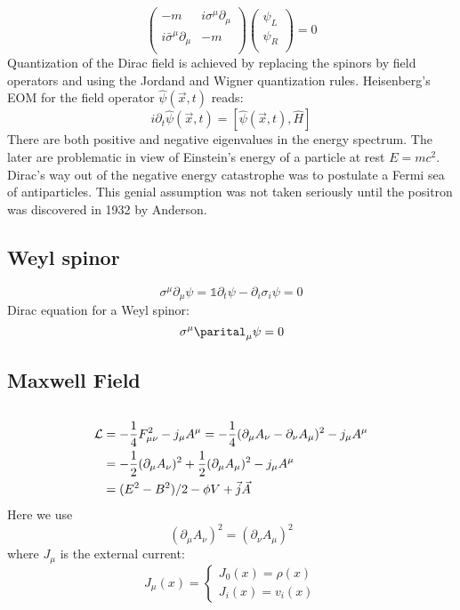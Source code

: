 \[
    \begin{pmatrix}
	-m  & i\sigma^\mu\partial_\mu	\\
	i\bar{\sigma}^\mu\partial_\mu	& -m	\\
    \end{pmatrix}
    \begin{pmatrix}
	\psi_L	\\
	\psi_R	\\
    \end{pmatrix} = 0
\]
Quantization of the Dirac field is achieved by replacing the spinors by
field operators and using the Jordand and Wigner quantization rules.
Heisenberg's EOM for the field operator $\hat{\psi}(\vec{x}, t)$
reads:
$$ i\partial_{t}\hat{\psi}(\vec{x}, t) = [
    \hat{\psi}(\vec{x}, t), \hat{H}]$$
There are both positive and negative eigenvalues in the energy spectrum. The
later are problematic in view of Einstein’s energy of a particle at rest 
$ E = mc^2 $. Dirac’s way out of the negative energy catastrophe was to 
postulate a Fermi sea of antiparticles. This genial assumption was not 
taken seriously until the positron was discovered in 1932 by Anderson.

\subsection{Weyl spinor}
\[  \sigma^\mu\partial_\mu\psi=\mathds{1}\partial_t\psi-\partial_i\sigma_i\psi=0    \]
Dirac equation for a Weyl spinor:
\[  \sigma^\mu\parital_\mu\psi=0    \]

\subsection{Maxwell Field}
\begin{equation}
    \label{Maxwell Eqn}
\end{equation}

\[ 
\begin{aligned}
    \mathcal{L} &= -\frac{1}{4}F^2_{\mu\nu} - j_{\mu}A^{\mu} 
    =-\frac{1}{4}(\partial_{\mu}A_\nu-\partial_{\nu}A_\mu)^2-j_{\mu}A^{\mu}\\
    &=-\frac{1}{2}(\partial_{\mu}A_\nu)^2+\frac{1}{2}(\partial_{\mu}A_\mu)^2-j_{\mu}A^{\mu}\\
    &=(E^2 - B^2)/2 - \phi V + \vec{j}\vec{A} 
\end{aligned}
    \]
Here we use
\[
    (\partial_{\mu}A_\nu)^2=(\partial_{\nu}A_\mu)^2
    \]
where $J_\mu$ is the external current:
\[ J_\mu(x) = \left\{ 
\begin{aligned}
    J_0(x) = \rho(x) \\
    J_i(x) = v_i(x)
\end{aligned}
\right.\]

